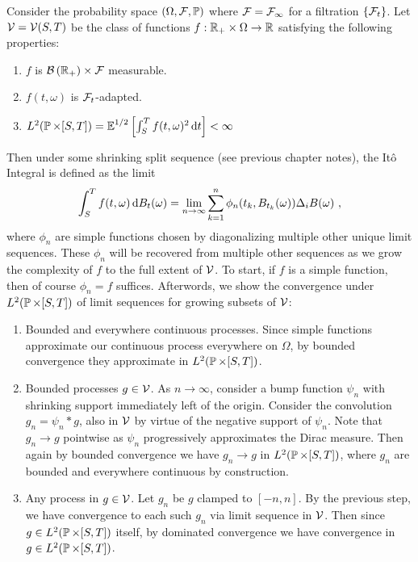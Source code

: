 \documentclass{article}
\begin{document}
\begin{definition}[It\^{o} Integral]
  Consider the probability space \((\Omega,\mcF,\P)\) where \(\mcF=\mcF_\infty\) for a filtration \(\ca{\mcF_t}\). Let \(\mcV =\mcV(S, T)\) be the class of functions \(f: \R_+\times \Omega\rightarrow\R\) satisfying the following properties:
  \begin{enumerate}
  \item \(f\) is \(\mathcal{B}\pa{\R_+}\times\mcF\) measurable.
  \item \(f(t, \omega)\) is \(\mcF_t\)-adapted.
  \item \(L^2(\P \times [S,T])=\E^{1/2}\ha{\int_S^T f(t,\omega)^2\d{t}}<\infty\)
  \end{enumerate}

  Then under some shrinking split sequence (see previous chapter notes), the It\^{o} Integral is defined as the limit
  \[
\int_S^Tf(t, \omega)\d{B_t(\omega)}=\lim_{n\rightarrow\infty}\sum_{k=1}^n\phi_n(t_k, B_{t_k}(\omega))\Delta_i B(\omega)\,\,,
\]
where \(\phi_n\) are simple functions chosen by diagonalizing multiple other unique limit sequences. These \(\phi_n\) will be recovered from multiple other sequences as we grow the complexity of \(f\) to the full extent of \(\mcV\). To start, if \(f\) is a simple function, then of course \(\phi_n=f\) suffices. Afterwords, we show the convergence under \(L^2(\P \times [S, T])\) of limit sequences for growing subsets of $\mcV$:
\begin{enumerate}
\item Bounded and everywhere continuous processes. Since simple functions approximate our continuous process everywhere on \(\Omega\), by bounded convergence they approximate in \(L^2(\P \times [S, T])\).
\item Bounded processes \(g\in \mcV\). As \(n\rightarrow\infty\), consider a bump function \(\psi_n\) with shrinking support immediately left of the origin. Consider the convolution \(g_n=\psi_n * g\), also in \(\mcV\) by virtue of the negative support of \(\psi_n\). Note that \(g_n\rightarrow g\) pointwise as \(\psi_n\) progressively approximates the Dirac measure. Then again by bounded convergence we have \(g_n\rightarrow g\) in \(L^2(\P \times [S, T])\), where \(g_n\) are bounded and everywhere continuous by construction.
\item Any process in \(g\in \mcV\). Let \(g_n\) be \(g\) clamped to \([-n, n]\). By the previous step, we have convergence to each such \(g_n\) via limit sequence in \(\mcV\). Then since \(g\in L^2(\P \times [S,T])\) itself, by dominated convergence we have convergence in \(g\in L^2(\P \times [S,T])\).
\end{enumerate} 
\end{definition}
\end{document}
